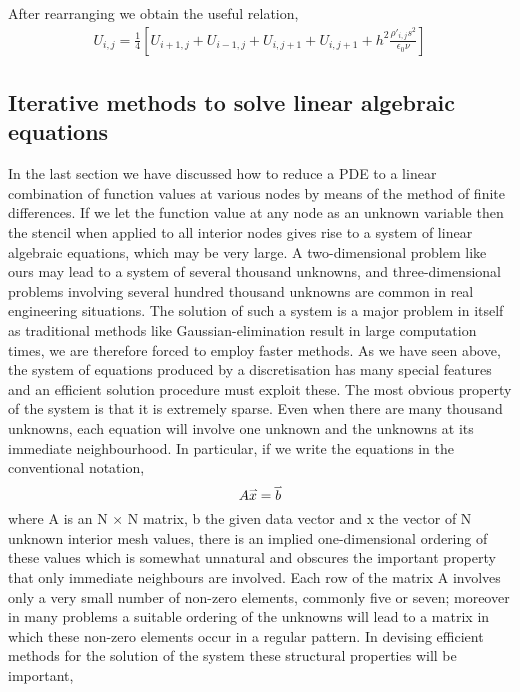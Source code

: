After rearranging we obtain the useful relation,
\begin{align}
    U_{i,j} = \frac{1}{4} \left[ U_{i+1,j}+ U_{i-1,j} + U_{i,j+1}+ U_{i,j+1} + h^2\frac{\rho'_{i,j} s^2}{\epsilon_0 \nu} \right]
\end{align}


\subsection{Iterative methods to solve linear algebraic equations}

In the last section we have discussed how to reduce a PDE to a linear combination of function values at various nodes by means of the method of finite differences. If we let the function value at any node as an unknown variable then the stencil when applied to all interior nodes gives rise to a system of linear algebraic equations, which may be very large. A two-dimensional problem like ours may lead to a system of several thousand unknowns, and three-dimensional problems involving several hundred thousand unknowns are common in real engineering situations. The solution of such a system is a major problem in itself as traditional methods like Gaussian-elimination result in large computation times, we are therefore forced to employ faster methods. As we have seen above, the system of equations produced by a discretisation has many special features and an eﬃcient solution procedure must exploit these. The most obvious property of the system is that it is extremely sparse. Even when there are many thousand unknowns, each equation will involve one unknown and the unknowns at its immediate neighbourhood. In particular, if we write the equations in the conventional notation,
\begin{equation*}
    A \accentset{\rightharpoonup}{x} = \accentset{\rightharpoonup}{b} 
\end{equation*}
where A is an N × N matrix, b the given data vector and x the vector
of N unknown interior mesh values, there is an implied one-dimensional
ordering of these values which is somewhat unnatural and obscures the
important property that only immediate neighbours are involved. Each
row of the matrix A involves only a very small number of non-zero
elements, commonly ﬁve or seven; moreover in many problems a suitable
ordering of the unknowns will lead to a matrix in which these non-zero
elements occur in a regular pattern. In devising eﬃcient methods for
the solution of the system these structural properties will be important,

